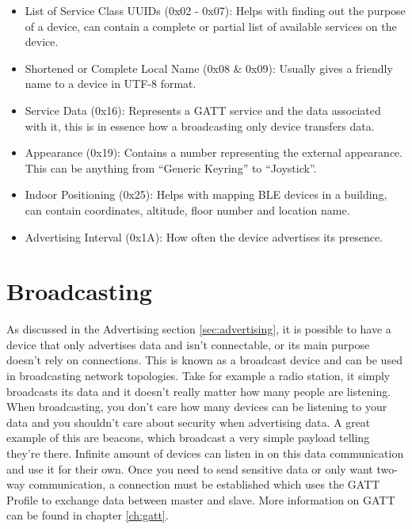 \documentclass[pdftex,a4paper,12pt,twoside]{report}
\begin{document}
\begin{itemize}
	\item {List of Service Class UUIDs (0x02 - 0x07): Helps with finding out the purpose of a device, can contain a complete or partial list of available services on the device.}
	\item {Shortened or Complete Local Name (0x08 \& 0x09): Usually gives a friendly name to a device in UTF-8 format.}
	\item {Service Data (0x16): Represents a GATT service and the data associated with it, this is in essence how a broadcasting only device transfers data.}
	\item {Appearance (0x19): Contains a number representing the external appearance. This can be anything from ``Generic Keyring'' to ``Joystick''.}
	\item {Indoor Positioning (0x25): Helps with mapping BLE devices in a building, can contain coordinates, altitude, floor number and location name.}
	\item {Advertising Interval (0x1A): How often the device advertises its presence.}
\end{itemize}

\section{Broadcasting}
\label{sec:broadcasting}
As discussed in the Advertising section \ref{sec:advertising}, it is possible to have a device that only advertises data and isn't connectable, or its main purpose doesn't rely on connections. This is known as a broadcast device and can be used in broadcasting network topologies. Take for example a radio station, it simply broadcasts its data and it doesn't really matter how many people are listening. When broadcasting, you don't care how many devices can be listening to your data and you shouldn't care about security when advertising data. A great example of this are beacons, which broadcast a very simple payload telling they're there. Infinite amount of devices can listen in on this data communication and use it for their own. Once you need to send sensitive data or only want two-way communication, a connection must be established which uses the GATT Profile to exchange data between master and slave. More information on GATT can be found in chapter \ref{ch:gatt}.
\end{document}
